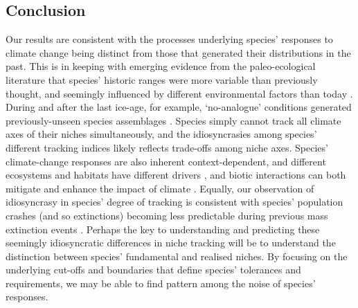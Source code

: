 \documentclass[12pt]{report}
\begin{document}
\clearpage
\subsection*{Conclusion}
Our results are consistent with the processes underlying species'
responses to climate change being distinct from those that generated
their distributions in the past. This is in keeping with emerging
evidence from the paleo-ecological literature that species' historic
ranges were more variable than previously thought, and seemingly
influenced by different environmental factors than today
\supercite{Veloz2012,Maguire2015}. During and after the last ice-age,
for example, `no-analogue' conditions generated previously-unseen
species assemblages \supercite{Williams2007,Veloz2012}. Species simply
cannot track all climate axes of their niches simultaneously, and the
idiosyncrasies among species' different tracking indices likely
reflects trade-offs among niche axes.  Species' climate-change
responses are also inherent context-dependent, and different
ecosystems and habitats have different drivers
\supercite{Bertrand2016,Antao2020}, and biotic interactions can both
mitigate and enhance the impact of climate \supercite{Vandvik2020}.
Equally, our observation of idiosyncrasy in species' degree of
tracking is consistent with species' population crashes (and so
extinctions) becoming less predictable during previous mass extinction
events \supercite{Levinton2001,Jablonski2004}. Perhaps the key to
understanding and predicting these seemingly idiosyncratic differences
in niche tracking will be to understand the distinction between
species' fundamental and realised niches. By focusing on the
underlying cut-offs and boundaries that define species' tolerances and
requirements, we may be able to find pattern among the noise of
species' responses.
\end{document}
